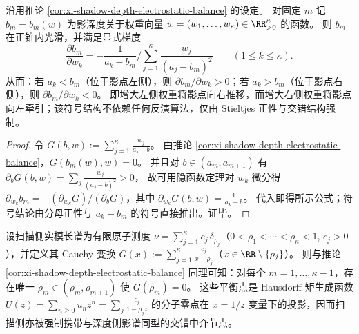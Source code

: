 \begin{proposition}\label{prop:xi-shadow-depth-gradient-wrt-weights}
沿用推论 \ref{cor:xi-shadow-depth-electrostatic-balance} 的设定。
对固定 \(m\) 记 \(b_m=b_m(w)\) 为影深度关于权重向量 \(w=(w_1,\dots,w_\kappa)\in\RR_{>0}^\kappa\) 的函数。
则 \(b_m\) 在正锥内光滑，并满足显式梯度
\[
\boxed{\;
\frac{\partial b_m}{\partial w_k}
=-\frac{1}{a_k-b_m}\Bigg/\sum_{j=1}^{\kappa}\frac{w_j}{(a_j-b_m)^2}\qquad(1\le k\le \kappa).\;}
\]
从而：若 \(a_k<b_m\)（位于影点左侧），则 \(\partial b_m/\partial w_k>0\)；若 \(a_k>b_m\)（位于影点右侧），则 \(\partial b_m/\partial w_k<0\)。
即增大左侧权重将影点向右推移，而增大右侧权重将影点向左牵引；该符号结构不依赖任何反演算法，仅由 Stieltjes 正性与交错结构强制。
\end{proposition}
\begin{proof}
令
\(
G(b,w):=\sum_{j=1}^{\kappa}\frac{w_j}{a_j-b}
\)。
由推论 \ref{cor:xi-shadow-depth-electrostatic-balance}，\(G(b_m(w),w)=0\)。
并且对 \(b\in(a_m,a_{m+1})\) 有
\(
\partial_b G(b,w)=\sum_j\frac{w_j}{(a_j-b)^2}>0
\)，
故可用隐函数定理对 \(w_k\) 微分得
\(
\partial_{w_k}b_m=-(\partial_{w_k}G)/(\partial_bG)
\)，其中 \(\partial_{w_k}G(b,w)=\frac{1}{a_k-b}\)。
代入即得所示公式；符号结论由分母正性与 \(a_k-b_m\) 的符号直接推出。证毕。
\end{proof}

\begin{remark}\label{rem:xi-scan-shadow-radius-cauchy-balance}
设扫描侧实模长谱为有限原子测度 \(\nu=\sum_{j=1}^{\kappa}c_j\,\delta_{\rho_j}\)（\(0<\rho_1<\cdots<\rho_\kappa<1\), \(c_j>0\)），并定义其 Cauchy 变换
\(
G(x):=\sum_{j=1}^{\kappa}\frac{c_j}{x-\rho_j}
\)（\(x\in\RR\setminus\{\rho_j\}\)）。
则与推论 \ref{cor:xi-shadow-depth-electrostatic-balance} 同理可知：对每个 \(m=1,\dots,\kappa-1\)，存在唯一 \(\widetilde\rho_m\in(\rho_m,\rho_{m+1})\) 使 \(G(\widetilde\rho_m)=0\)。
这些平衡点是 Hausdorff 矩生成函数 \(U(z)=\sum_{n\ge0}u_n z^n=\sum_j\frac{c_j}{1-\rho_j z}\) 的分子零点在 \(x=1/z\) 变量下的投影，因而扫描侧亦被强制携带与深度侧影谱同型的交错中介节点。
\end{remark}

